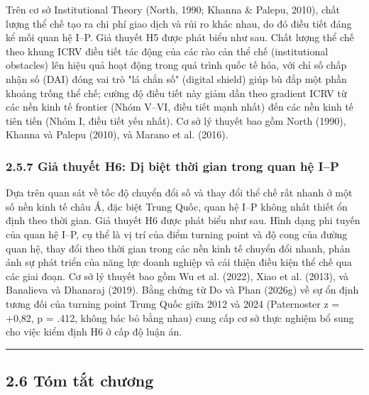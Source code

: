 \documentclass[12pt,a4paper]{article}
\begin{document}
Trên cơ sở Institutional Theory (North, 1990; Khanna \& Palepu, 2010),
chất lượng thể chế tạo ra chi phí giao dịch và rủi ro khác nhau, do đó
điều tiết đáng kể mối quan hệ I--P. Giả thuyết H5 được phát biểu như
sau. Chất lượng thể chế theo khung ICRV điều tiết tác động của các rào
cản thể chế (institutional obstacles) lên hiệu quả hoạt động trong quá
trình quốc tế hóa, với chỉ số chấp nhận số (DAI) đóng vai trò "lá chắn
số" (digital shield) giúp bù đắp một phần khoảng trống thể chế; cường độ
điều tiết này giảm dần theo gradient ICRV từ các nền kinh tế frontier
(Nhóm V--VI, điều tiết mạnh nhất) đến các nền kinh tế tiên tiến (Nhóm I,
điều tiết yếu nhất). Cơ sở lý thuyết bao gồm North (1990), Khanna và
Palepu (2010), và Marano et al. (2016).

\hypertarget{257-giux1ea3-thuyux1ebft-h6-dux1ecb-biux1ec7t-thux1eddi-gian-trong-quan-hux1ec7-ip}{%
\subsubsection{2.5.7 Giả thuyết H6: Dị biệt thời gian trong quan hệ
I--P}\label{257-giux1ea3-thuyux1ebft-h6-dux1ecb-biux1ec7t-thux1eddi-gian-trong-quan-hux1ec7-ip}}

Dựa trên quan sát về tốc độ chuyển đổi số và thay đổi thể chế rất nhanh
ở một số nền kinh tế châu Á, đặc biệt Trung Quốc, quan hệ I--P không
nhất thiết ổn định theo thời gian. Giả thuyết H6 được phát biểu như sau.
Hình dạng phi tuyến của quan hệ I--P, cụ thể là vị trí của điểm turning
point và độ cong của đường quan hệ, thay đổi theo thời gian trong các
nền kinh tế chuyển đổi nhanh, phản ánh sự phát triển của năng lực doanh
nghiệp và cải thiện điều kiện thể chế qua các giai đoạn. Cơ sở lý thuyết
bao gồm Wu et al. (2022), Xiao et al. (2013), và Banalieva và Dhanaraj
(2019). Bằng chứng từ Do và Phan (2026g) về sự ổn định tương đối của
turning point Trung Quốc giữa 2012 và 2024 (Paternoster z = +0,82, p =
.412, không bác bỏ bằng nhau) cung cấp cơ sở thực nghiệm bổ sung cho
việc kiểm định H6 ở cấp độ luận án.

\begin{center}\rule{0.5\linewidth}{0.5pt}\end{center}

\hypertarget{26-tuxf3m-tux1eaft-chux1b0ux1a1ng}{%
\subsection{2.6 Tóm tắt
chương}\label{26-tuxf3m-tux1eaft-chux1b0ux1a1ng}}
\end{document}
